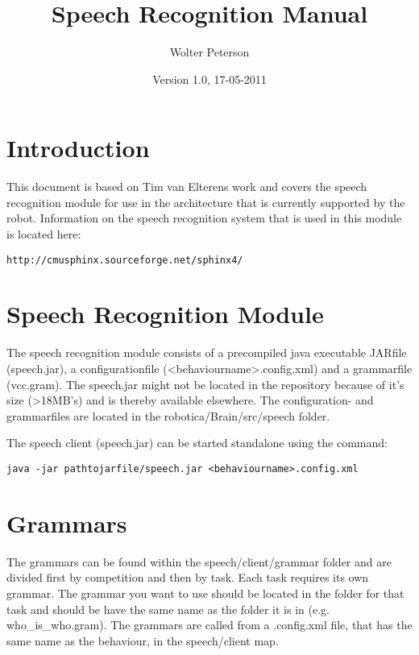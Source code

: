 \documentclass[a4paper, 10pt]{article}
\title{\huge{Speech Recognition Manual}}
\author{Wolter Peterson}
\date{Version 1.0, 17-05-2011}
\begin{document}
\maketitle

\section{Introduction}

This document is based on Tim van Elterens work and covers the speech recognition module for use in the architecture that is currently supported by the robot. Information on the speech recognition system that is used in this module is located here:

\begin{verbatim}
http://cmusphinx.sourceforge.net/sphinx4/
\end{verbatim}


\section{Speech Recognition Module}

The speech recognition module consists of a precompiled java executable JARfile (speech.jar), a configurationfile (\textless behaviourname\textgreater.config.xml) and a grammarfile (vcc.gram). The speech.jar might not be located in the repository because of it's size (\textgreater18MB's) and is thereby available elsewhere. The configuration- and grammarfiles are located in the robotica/Brain/src/speech folder.

The speech client (speech.jar) can be started standalone using the command: 

\begin{verbatim}
java -jar pathtojarfile/speech.jar <behaviourname>.config.xml
\end{verbatim}

\section{Grammars}

The grammars can be found within the speech/client/grammar folder and are divided first by competition and then by task. Each task requires its own grammar. 
The grammar you want to use should be located in the folder for that task and should be have the same name as the folder it is in (e.g. who\_is\_who.gram).
The grammars are called from a .config.xml file, that has the same name as the behaviour, in the speech/client map.
\end{document}
